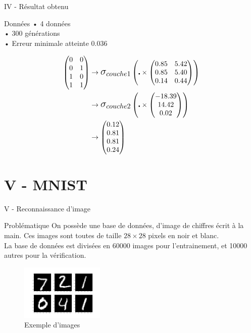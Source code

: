 \documentclass[10pt]{beamer}
\begin{document}
\begin{frame}{IV - Résultat obtenu}
\begin{block}{Données}
• 4 données \\
• 300 générations \\
• Erreur minimale atteinte 0.036
\end{block}
\begin{align*} 
\begin{pmatrix}
0 & 0 \\ 
0 & 1 \\ 
1 & 0 \\ 
1 & 1 
\end{pmatrix} 
		&\to  
\mathlarger{\mathlarger{\sigma_{couche1}}}
\left( \centerdot \times
\begin{pmatrix}
0.85 & 5.42 \\ 
0.85 & 5.40 \\ 
0.14 & 0.44
\end{pmatrix}
\right) \\ 
 		&\to
\mathlarger{\mathlarger{\sigma_{couche2}}}
\left( \centerdot \times
\begin{pmatrix}
-18.39\\ 
14.42 \\ 
0.02
\end{pmatrix}
\right) \\
 		&\to
\begin{pmatrix}
0.12 \\ 
0.81 \\ 
0.81 \\ 
0.24
\end{pmatrix}
\end{align*}
\end{frame}

\section{V - MNIST}
\begin{frame}{V - Reconnaissance d'image}
\begin{block}{Problématique}
On possède une base de données, d'image de chiffres écrit à la main. Ces images sont toutes de taille $28 \times 28$ pixels en noir et blanc. \\
La base de données est divisées en 60000 images pour l'entrainement, et 10000 autres pour la vérification.
\end{block}
\begin{figure}
	\centering
    \includegraphics[width=150px]{1-mnist.jpg}
	\caption{Exemple d'images}
\end{figure}
\end{frame}
\end{document}
